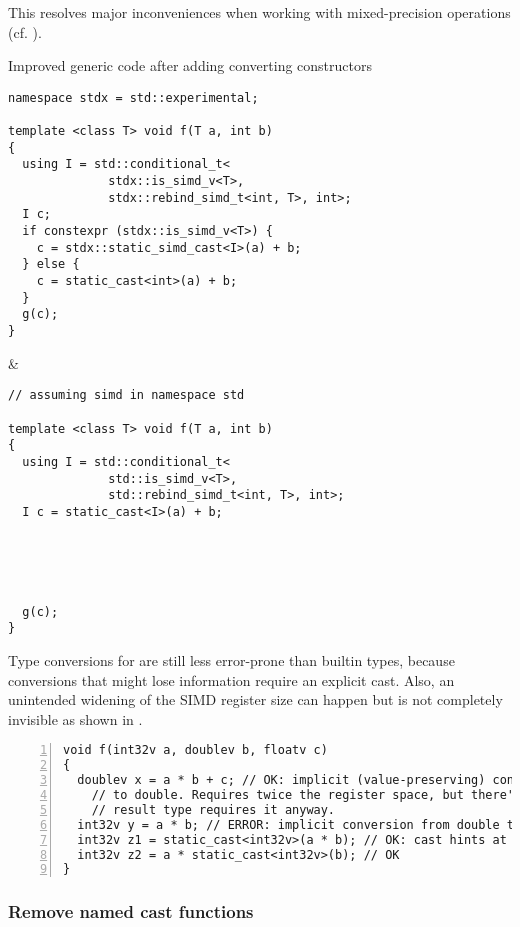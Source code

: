This resolves major inconveniences when working with mixed-precision
operations (cf. ).
\begin{tonytable}{Improved generic code after adding converting constructors}\label{tt:better with conv ctors}
  \begin{lstlisting}
namespace stdx = std::experimental;

template <class T> void f(T a, int b)
{
  using I = std::conditional_t<
              stdx::is_simd_v<T>,
              stdx::rebind_simd_t<int, T>, int>;
  I c;
  if constexpr (stdx::is_simd_v<T>) {
    c = stdx::static_simd_cast<I>(a) + b;
  } else {
    c = static_cast<int>(a) + b;
  }
  g(c);
}
  \end{lstlisting}
  &
  \begin{lstlisting}
// assuming simd in namespace std

template <class T> void f(T a, int b)
{
  using I = std::conditional_t<
              std::is_simd_v<T>,
              std::rebind_simd_t<int, T>, int>;
  I c = static_cast<I>(a) + b;





  g(c);
}
  \end{lstlisting}
\end{tonytable}%
Type conversions for  are still less error-prone than builtin types,
because conversions that might lose information require an explicit cast.
Also, an unintended widening of the SIMD register size can happen but is not
completely invisible as shown in .

\begin{lstlisting}[numbers=left,float={hbtp},label=lst:mixedprecision,caption={
  Mixed precision code using the types from \lst{lst:simdtypespattern}, ensuring equal element count
}]
void f(int32v a, doublev b, floatv c)
{
  doublev x = a * b + c; // OK: implicit (value-preserving) conversion from int and float
    // to double. Requires twice the register space, but there's no way around it and the
    // result type requires it anyway.
  int32v y = a * b; // ERROR: implicit conversion from double to int not value-preserving
  int32v z1 = static_cast<int32v>(a * b); // OK: cast hints at implicit register widening
  int32v z2 = a * static_cast<int32v>(b); // OK
}
\end{lstlisting}

\subsubsection{Remove named cast functions}


